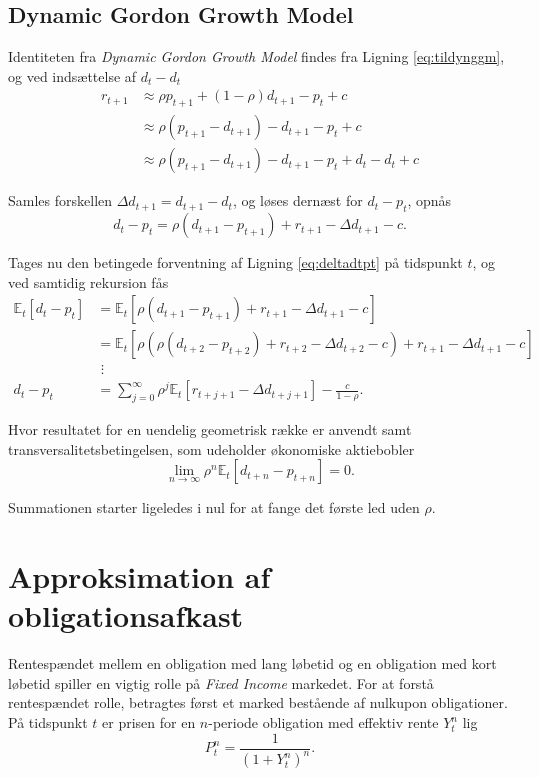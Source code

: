 \documentclass[
  a4paper,
  oneside]{memoir}
\begin{document}
\hypertarget{dynamic-gordon-growth-model}{%
\subsection{Dynamic Gordon Growth Model}\label{dynamic-gordon-growth-model}}

Identiteten fra \emph{Dynamic Gordon Growth Model} findes fra Ligning \eqref{eq:tildynggm}, og ved indsættelse af \(d_t-d_t\)
\begin{align*}
r_{t+1}&\approx \rho p_{t+1} + (1-\rho) d_{t+1} - p_t + c\\
&\approx \rho(p_{t+1}-d_{t+1})-d_{t+1}-p_t+c\\
&\approx \rho(p_{t+1}-d_{t+1})-d_{t+1}-p_t+d_t-d_t+c
\end{align*}

Samles forskellen \(\Delta d_{t+1}=d_{t+1}-d_t\), og løses dernæst for \(d_t-p_t\), opnås
\begin{equation}
d_t-p_t=\rho (d_{t+1}-p_{t+1})+r_{t+1}-\Delta d_{t+1}-c. \label{eq:deltadtpt}
\end{equation}

Tages nu den betingede forventning af Ligning \eqref{eq:deltadtpt} på tidspunkt \(t\), og ved samtidig rekursion fås
\begin{align*}
\mathbb{E}_t[d_t-p_t]&=\mathbb{E}_t[\rho(d_{t+1}-p_{t+1}) + r_{t+1} -\Delta d_{t+1}-c]\\
&=\mathbb{E}_t[\rho(\rho(d_{t+2}-p_{t+2}) + r_{t+2} -\Delta d_{t+2}-c) + r_{t+1} -\Delta d_{t+1} - c]\\
&\,\,\vdots\\
d_t-p_t&=\sum_{j=0}^\infty \rho^j \mathbb{E}_t[r_{t+j+1}-\Delta d_{t+j+1}] - \frac{c}{1-\rho}.
\end{align*}

Hvor resultatet for en uendelig geometrisk række er anvendt samt transversalitetsbetingelsen, som udeholder økonomiske aktiebobler
\[\lim_{n\to\infty} \rho^n \mathbb{E}_t[d_{t+n} - p_{t+n}]=0.\]

Summationen starter ligeledes i nul for at fange det første led uden \(\rho\).

\hypertarget{approksimation-af-obligationsafkast}{%
\section{Approksimation af obligationsafkast}\label{approksimation-af-obligationsafkast}}

Rentespændet mellem en obligation med lang løbetid og en obligation med kort løbetid spiller en vigtig rolle på \emph{Fixed Income} markedet. For at forstå rentespændet rolle, betragtes først et marked bestående af nulkupon obligationer. På tidspunkt \(t\) er prisen for en \(n\)-periode obligation med effektiv rente \(Y_t^n\) lig
\begin{equation}
P_t^n=\frac{1}{\left(1+Y_t^n\right)^n}. \label{eq:fundaobl}
\end{equation}
\end{document}

